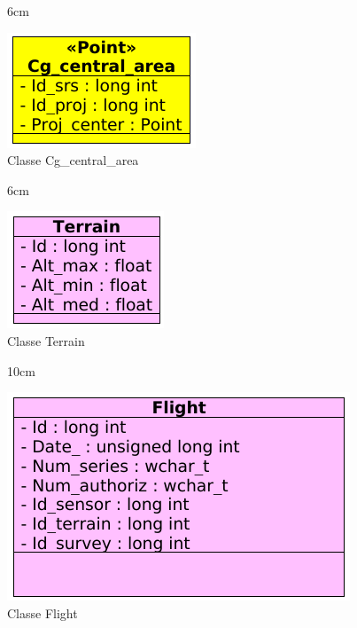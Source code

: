 \begin{figure}[!ht]{6cm}
  \caption{Classe Cg\_central\_area} \label{cg}
  \centering
  \includegraphics[width=0.6\hsize]{figuras/32.png}
\end{figure}

\begin{figure}[!ht]{6cm}
  \caption{Classe Terrain} \label{terrain}
  \centering
  \includegraphics[width=0.6\hsize]{figuras/37.png}
\end{figure}

\begin{figure}[!ht]{10cm}
  \caption{Classe Flight} \label{flight}
  \centering
  \includegraphics[width=0.6\hsize]{figuras/34.png}
\end{figure}

